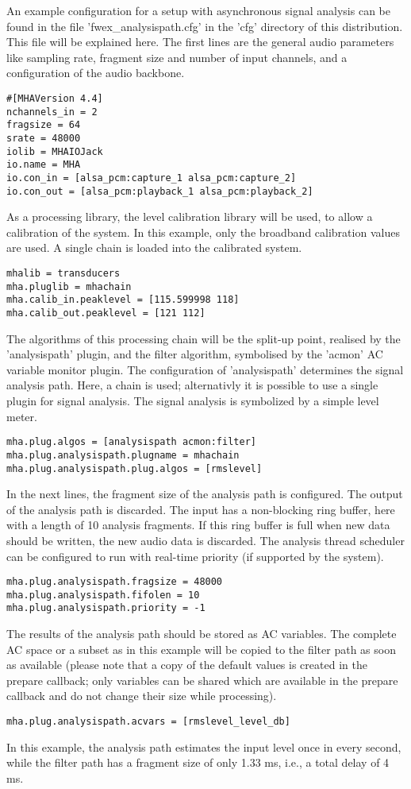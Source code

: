 An example configuration for a setup with asynchronous signal analysis
can be found in the file 'fwex\_analysispath.cfg' in the 'cfg'
directory of this distribution.
%
This file will be explained here.
%
The first lines are the general audio parameters like sampling rate,
fragment size and number of input channels, and a configuration of the
audio backbone.
\begin{verbatim}
#[MHAVersion 4.4]
nchannels_in = 2
fragsize = 64
srate = 48000
iolib = MHAIOJack
io.name = MHA
io.con_in = [alsa_pcm:capture_1 alsa_pcm:capture_2]
io.con_out = [alsa_pcm:playback_1 alsa_pcm:playback_2]
\end{verbatim}
As a processing library, the level calibration library will be used,
to allow a calibration of the system.
%
In this example, only the broadband calibration values are used.
%
A single chain is loaded into the calibrated system.
\begin{verbatim}
mhalib = transducers
mha.pluglib = mhachain
mha.calib_in.peaklevel = [115.599998 118]
mha.calib_out.peaklevel = [121 112]
\end{verbatim}
The algorithms of this processing chain will be the split-up point,
realised by the 'analysispath' plugin, and the filter algorithm,
symbolised by the 'acmon' AC variable monitor plugin.
%
The configuration of 'analysispath' determines the signal analysis
path.
%
Here, a chain is used; alternativly it is possible to use a single
plugin for signal analysis.
%
The signal analysis is symbolized by a simple level meter.

\begin{verbatim}
mha.plug.algos = [analysispath acmon:filter]
mha.plug.analysispath.plugname = mhachain
mha.plug.analysispath.plug.algos = [rmslevel]
\end{verbatim}
In the next lines, the fragment size of the analysis path is
configured. The output of the analysis path is discarded.  The input
has a non-blocking ring buffer, here with a length of 10 analysis
fragments. If this ring buffer is full when new data should be
written, the new audio data is discarded. The analysis thread
scheduler can be configured to run with real-time priority (if
supported by the system).
\begin{verbatim}
mha.plug.analysispath.fragsize = 48000
mha.plug.analysispath.fifolen = 10
mha.plug.analysispath.priority = -1
\end{verbatim}
The results of the analysis path should be stored as AC variables. The
complete AC space or a subset as in this example will be copied to the
filter path as soon as available (please note that a copy of the
default values is created in the prepare callback; only variables can
be shared which are available in the prepare callback and do not
change their size while processing).
\begin{verbatim}
mha.plug.analysispath.acvars = [rmslevel_level_db]
\end{verbatim}
In this example, the analysis path estimates the input level once in
every second, while the filter path has a fragment size of only 1.33
ms, i.e., a total delay of 4 ms.


